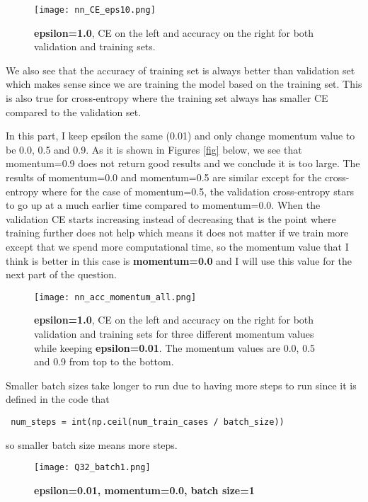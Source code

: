\documentclass[10pt]{article}
\begin{document}
\begin{figure}[H]
	\centering
	\texttt{[image: nn\_CE\_eps10.png]}
	\caption{\textbf{epsilon=1.0}, CE on the left and accuracy on the right for both validation and training sets.}
	\label{fig:refer2}
\end{figure}

We also see that the accuracy of training set is always better than validation set which makes sense since we are training the model based on the training set.
This is also true for cross-entropy where the training set always has smaller CE compared to the validation set.


In this part, I keep epsilon the same (0.01) and only change momentum value to be 0.0, 0.5 and 0.9. As it is shown in Figures \ref{fig} below, we see that momentum=0.9 does not return good results and we conclude it is too large. The results of momentum=0.0 and momentum=0.5 are similar except for the cross-entropy where for the case of momentum=0.5, the validation cross-entropy stars to go up at a much earlier time compared to momentum=0.0. When the validation CE starts increasing instead of decreasing that is the point where training further does not help which means it does not matter if we train more except that we spend more computational time, so the momentum value that I think is better in this case is \textbf{momentum=0.0} and I will use this value for the next part of the question.

\begin{figure}[H]
	\centering
	\texttt{[image: nn\_acc\_momentum\_all.png]}
	\caption{\textbf{epsilon=1.0}, CE on the left and accuracy on the right for both validation and training sets for three different momentum values while keeping \textbf{epsilon=0.01}. The momentum values 	are 0.0, 0.5 and 0.9 from top to the bottom.}
	\label{fig:refer2}
\end{figure}

Smaller batch sizes take longer to run due to having more steps to run since it is defined in the code that \begin{verbatim} num_steps = int(np.ceil(num_train_cases / batch_size)) \end{verbatim} so smaller batch size means more steps.

\begin{figure}[H]
	\centering
	\texttt{[image: Q32\_batch1.png]}
	\caption{\textbf{epsilon=0.01, momentum=0.0, batch size=1}}
	\label{fig:Q32_batch10}
\end{figure}
\end{document}
